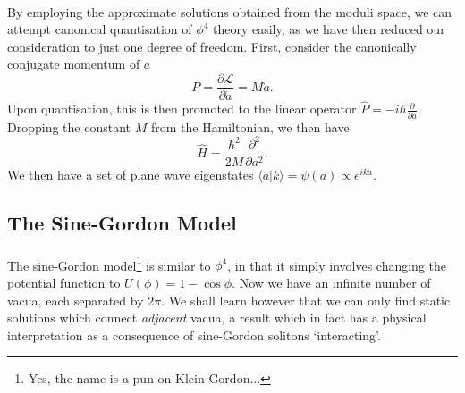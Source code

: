 \documentclass[11pt, fleqn]{article}
\begin{document}
\paragraph{} By employing the approximate solutions obtained from the moduli space, we can attempt canonical quantisation of $ \phi^4 $ theory easily, as we have then reduced our consideration to just one degree of freedom. First, consider the canonically conjugate momentum of $ a $
	\begin{equation}\label{key}
		P = \frac{\partial \mathscr{L}}{\partial \dot{a}} = M \dot{a}.
	\end{equation}
Upon quantisation, this is then promoted to the linear operator $ \hat{P} = -i \hbar \frac{\partial}{\partial a} $. Dropping the constant $ M $ from the Hamiltonian, we then have
\begin{equation}\label{key}
	\hat{H} = \frac{\hbar^2}{2M} \frac{\partial^2}{\partial a^2}.
\end{equation}
We then have a set of plane wave eigenstates $ \langle a | k \rangle = \psi(a) \propto e^{ika} $.

\subsection{The Sine-Gordon Model}

\paragraph{} The sine-Gordon model\footnote{Yes, the name is a pun on Klein-Gordon...} is similar to $ \phi^4 $, in that it simply involves changing the potential function to $ U(\phi) = 1 - \cos \phi $. Now we have an infinite number of vacua, each separated by $ 2 \pi $. We shall learn however that we can only find static solutions which connect \textit{adjacent} vacua, a result which in fact has a physical interpretation as a consequence of sine-Gordon solitons `interacting'.
\end{document}
